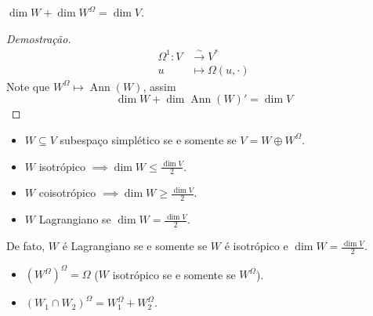\begin{lemma}
	$\dim W+\dim W^{\Omega} =\dim V$.
\end{lemma}
\begin{proof}[Demostra\c c\~ao]
	\begin{align*}
		\Omega^{1}: V &\overset{\sim}{\to }V^{*} \\
	u &\longmapsto \Omega(u,\cdot )
	\end{align*}
	Note que $W^{\Omega} \mapsto \operatorname{Ann}(W)$, assim
	\[\dim W+\dim \operatorname{Ann}(W)'=\dim V\]
\end{proof}

\begin{remark}\leavevmode
	\begin{itemize}
		\item $W\subseteq V$ subespa\c co simpl\'etico  se e somente se  $V=W\oplus W^{\Omega}$.
		\item $W$ isotr\'opico $\implies \dim W\leq \frac{\dim V}{2}$.
		\item $W$ coisotr\'opico $\implies \dim W\geq \frac{\dim V}{2}$.
		\item $W$ Lagrangiano se $\dim W=\frac{\dim V}{2}$.
	\end{itemize}
\end{remark}

De fato, $W$ \'e Lagrangiano se e somente se  $W$ \'e isotr\'opico e $\dim W=\frac{\dim V}{2}$.

\begin{exercise}\leavevmode 
	\begin{itemize}
		\item $(W^{\Omega})^{\Omega}=\Omega$ ($W$ isotr\'opico se e somente se  $W^{\Omega}$).
		\item $(W_1\cap W_2)^{\Omega} =W_1^{\Omega} +W_2^{\Omega}$.
	\end{itemize}
\end{exercise}

